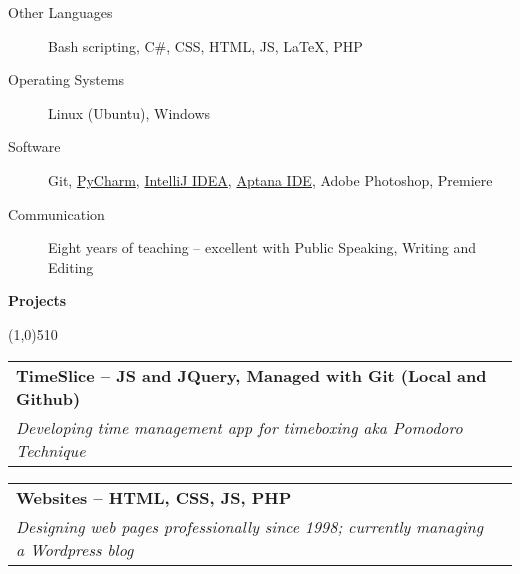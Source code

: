 \documentclass[letterpaper,11pt]{article}
\makeatletter
\newcommand{\resheading}[1]{{\large {\begin{minipage}{\textwidth}{\textbf{#1 \vphantom{p\^{E}}}}\end{minipage}}}}
\newcommand{\ressubheading}[4]{
\begin{tabular*}{6.5in}{l@{\extracolsep{\fill}}r}
		\textbf{#1} & #2 \\
		\textit{#3} & \textit{#4} \\
\end{tabular*}\vspace{-6pt}}
\makeatother
\begin{document}
	\begin{description}
    	\item[Other Languages] Bash scripting, C\#, CSS, HTML, JS, \LaTeX , PHP

		\item[Operating Systems]
			Linux (Ubuntu), Windows
	
		
		\item[Software] Git, \href{http://www.jetbrains.com/pycharm/}{PyCharm},
		\href{http://www.jetbrains.com/idea/}{IntelliJ IDEA},
		\href{http://www.aptana.com/}{Aptana IDE}, Adobe Photoshop, Premiere


		\item[Communication] 
			Eight years of teaching -- excellent with Public Speaking, Writing and Editing
	
	\end{description} %


\resheading{Projects}

\line(1,0){510}

	\begin{description}
		\item 
    		\ressubheading
    		{TimeSlice -- JS and JQuery, Managed with Git (Local and Github)}{}
    		{Developing time management app for timeboxing aka Pomodoro Technique}{}
		\item 
    		\ressubheading
    		{Websites -- HTML, CSS, JS, PHP}{}
    		{Designing web pages professionally since 1998; currently managing a Wordpress blog}{}

		
		



	\end{description} %
\end{document}
